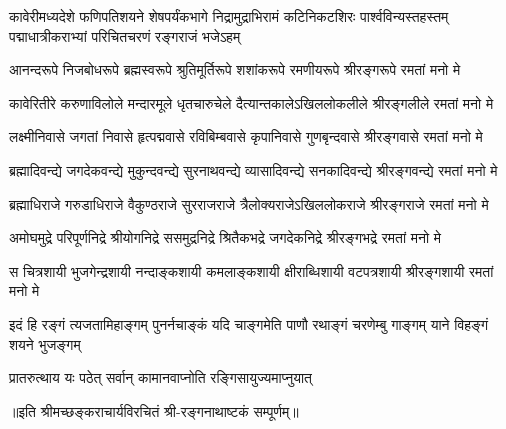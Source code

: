 
{कावेरीमध्यदेशे फणिपतिशयने शेषपर्यंकभागे}
{निद्रामुद्राभिरामं कटिनिकटशिरः पार्श्वविन्यस्तहस्तम्}
{पद्माधात्रीकराभ्यां परिचितचरणं रङ्गराजं भजेऽहम्}

\fourlineindentedshloka
{आनन्दरूपे  निजबोधरूपे}
{ब्रह्मस्वरूपे श्रुतिमूर्तिरूपे}
{शशांकरूपे रमणीयरूपे}
{श्रीरङ्गरूपे रमतां मनो मे}

\fourlineindentedshloka
{कावेरितीरे करुणाविलोले}
{मन्दारमूले धृतचारुचेले}
{दैत्यान्तकालेऽखिललोकलीले}
{श्रीरङ्गलीले रमतां मनो मे}

\fourlineindentedshloka
{लक्ष्मीनिवासे जगतां निवासे}
{हृत्पद्मवासे रविबिम्बवासे}
{कृपानिवासे गुणबृन्दवासे}
{श्रीरङ्गवासे रमतां मनो मे}


\fourlineindentedshloka
{ब्रह्मादिवन्द्ये जगदेकवन्द्ये}
{मुकुन्दवन्द्ये सुरनाथवन्द्ये}
{व्यासादिवन्द्ये सनकादिवन्द्ये}
{श्रीरङ्गवन्द्ये रमतां मनो मे}

\fourlineindentedshloka
{ब्रह्माधिराजे गरुडाधिराजे}
{वैकुण्ठराजे सुरराजराजे}
{त्रैलोक्यराजेऽखिललोकराजे}
{श्रीरङ्गराजे रमतां मनो मे}

\fourlineindentedshloka
{अमोघमुद्रे परिपूर्णनिद्रे}
{श्रीयोगनिद्रे ससमुद्रनिद्रे}
{श्रितैकभद्रे जगदेकनिद्रे}
{श्रीरङ्गभद्रे रमतां मनो मे}


\fourlineindentedshloka
{स चित्रशायी भुजगेन्द्रशायी}
{नन्दाङ्कशायी कमलाङ्कशायी}
{क्षीराब्धिशायी वटपत्रशायी}
{श्रीरङ्गशायी रमतां मनो मे}


\fourlineindentedshloka
{इदं हि रङ्गं त्यजतामिहाङ्गम्}
{पुनर्नचाङ्कं यदि चाङ्गमेति}
{पाणौ रथाङ्गं चरणेम्बु गाङ्गम्}
{याने विहङ्गं शयने भुजङ्गम्}


{प्रातरुत्थाय यः पठेत्}
{सर्वान् कामानवाप्नोति}
{रङ्गिसायुज्यमाप्नुयात्}

{॥इति श्रीमच्छङ्कराचार्यविरचितं श्री-रङ्गनाथाष्टकं सम्पूर्णम्॥}